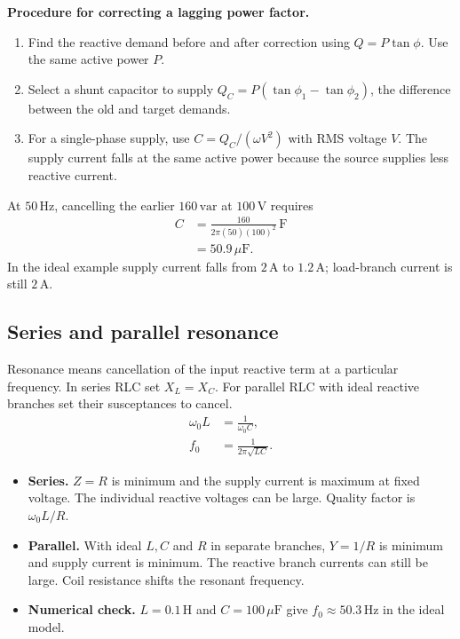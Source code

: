 \documentclass[12pt,a4paper]{article}
\begin{document}
\textbf{Procedure for correcting a lagging power factor.}
\begin{enumerate}[leftmargin=*, itemsep=3pt, topsep=4pt]
  \item Find the reactive demand before and after correction using \(Q=P\tan\phi\). Use the same active power \(P\).
  \item Select a shunt capacitor to supply \(Q_C=P(\tan\phi_1-\tan\phi_2)\), the difference between the old and target demands.
  \item For a single-phase supply, use \(C=Q_C/(\omega V^2)\) with RMS voltage \(V\). The supply current falls at the same active power because the source supplies less reactive current.
\end{enumerate}
At \(50\,\mathrm{Hz}\), cancelling the earlier \(160\,\mathrm{var}\) at \(100\,\mathrm V\) requires
\[
\begin{aligned}
C&=\frac{160}{2\pi(50)(100)^2}\,\mathrm F\\
 &=50.9\,\mu\mathrm F .
\end{aligned}
\]
In the ideal example supply current falls from \(2\,\mathrm A\) to \(1.2\,\mathrm A\); load-branch current is still \(2\,\mathrm A\).

\subsection{Series and parallel resonance}
Resonance means cancellation of the input reactive term at a particular frequency. In series RLC set \(X_L=X_C\). For parallel RLC with ideal reactive branches set their susceptances to cancel.
\[
\begin{aligned}
\omega_0 L &=\frac{1}{\omega_0 C},\\
f_0 &=\frac{1}{2\pi\sqrt{LC}}.
\end{aligned}
\]
\begin{itemize}[leftmargin=*, itemsep=3pt, topsep=4pt]
  \item \textbf{Series.} \(Z=R\) is minimum and the supply current is maximum at fixed voltage. The individual reactive voltages can be large. Quality factor is \(\omega_0L/R\).
  \item \textbf{Parallel.} With ideal \(L,C\) and \(R\) in separate branches, \(Y=1/R\) is minimum and supply current is minimum. The reactive branch currents can still be large. Coil resistance shifts the resonant frequency.
  \item \textbf{Numerical check.} \(L=0.1\,\mathrm H\) and \(C=100\,\mu\mathrm F\) give \(f_0\approx50.3\,\mathrm{Hz}\) in the ideal model.
\end{itemize}
\end{document}
